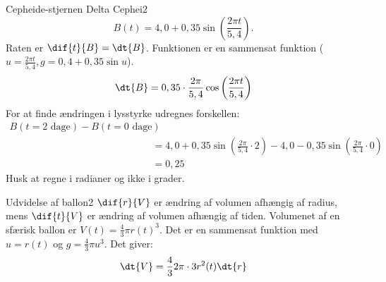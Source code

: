 \begin{opgave}{Cepheide-stjernen Delta Cephei}{2}
\begin{equation*}
B(t) = 4,0 + 0,35\sin \left( \frac{2\pi t}{5,4} \right).
\end{equation*}
\opg Raten er $\dif{t}{B} = \dt{B}$. Funktionen er en sammensat funktion ($u=\frac{2\pi t}{5,4}, g=0,4+0,35 \sin u$).
\begin{equation*}
\dt{B} = 0,35 \cdot \frac{2\pi}{5,4} \cos \left( \frac{2\pi t}{5,4} \right)
\end{equation*}
\opg For at finde ændringen i lysstyrke udregnes forskellen:
\begin{align*}
B(t=\text{2 dage})-B(t=\text{0 dage}) \\
&= 4,0 + 0,35\sin\left(\frac{2\pi}{5,4} \cdot 2 \right) - 4,0 -0,35\sin\left(\frac{2\pi}{5,4} \cdot 0 \right) \\
&= 0,25
\end{align*}
Husk at regne i radianer og ikke i grader.
\end{opgave}

\begin{opgave}{Udvidelse af ballon}{2}
\opg $\dif{r}{V}$ er ændring af volumen afhængig af radius, mens $\dif{t}{V}$ er ændring af volumen afhængig af tiden.
\opg Volumenet af en sfærisk ballon er $V(t)=\frac{4}{3} \pi r(t)^3$. Det er en sammensat funktion med $u=r(t)$ og $g=\frac{4}{3} \pi u^3$. Det giver:
\begin{equation*}
\dt{V} = \frac{4}{3} 2\pi \cdot 3 r^2(t) \dt{r}
\end{equation*}
\end{opgave}

